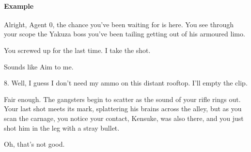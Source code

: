 \paragraph{Example}
\begin{dialogue}
   Alright, Agent 0, the chance you've been waiting for is
  here. You see through your scope the Yakuza boss you've been tailing
  getting out of his armoured limo.

   You screwed up for the last time. I take the shot.

   Sounds like Aim to me.

   8. Well, I guess I don't need my ammo on this
  distant rooftop. I'll empty the clip.

   Fair enough. The gangsters begin to scatter as the sound
  of your rifle rings out. Your last shot meets its mark, splattering
  his brains across the alley, but as you scan the carnage, you notice
  your contact, Kensuke, was also there, and you just shot him in the
  leg with a stray bullet.

   Oh, that's not good.
\end{dialogue}





